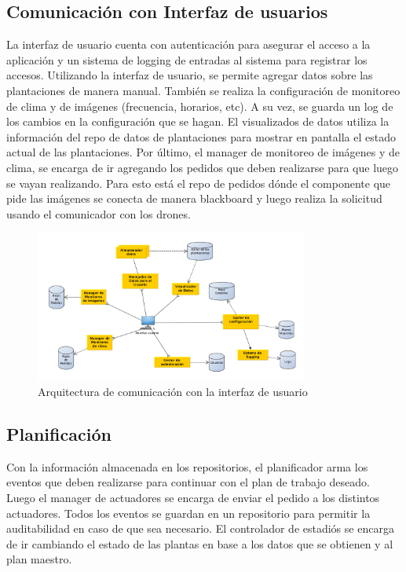 \subsection{Comunicación con Interfaz de usuarios}

La interfaz de usuario cuenta con autenticación para asegurar el acceso a la aplicación y un sistema de logging de entradas al sistema para registrar los accesos.
Utilizando la interfaz de usuario, se permite agregar datos sobre las plantaciones de manera manual. También se realiza la configuración de monitoreo de clima y de imágenes (frecuencia, horarios, etc). A su vez, se guarda un log de los cambios en la configuración que se hagan. El visualizados de datos utiliza la información del repo de datos de plantaciones para mostrar en pantalla el estado actual de las plantaciones.
Por último, el manager de monitoreo de imágenes  y de clima, se encarga de ir agregando los pedidos que deben realizarse para que luego se vayan realizando. Para esto está el repo de pedidos dónde el componente que pide las imágenes se conecta de manera blackboard y luego realiza la solicitud usando el comunicador con los drones.

\begin{figure}[h!]
  \centering
  \includegraphics[width=0.8\textwidth]{./images/arq_interfazusuario.png}
  \caption{Arquitectura de comunicación con la interfaz de usuario}
  \label{fig:clases4}
\end{figure}

\subsection{Planificación}

Con la información almacenada en los repositorios, el planificador arma los eventos que deben realizarse para continuar con el plan de trabajo deseado. Luego el manager de actuadores se encarga de enviar el pedido a los distintos actuadores. Todos los eventos se guardan en un repositorio para permitir la auditabilidad en caso de que sea necesario. El controlador de estadiós se encarga de ir cambiando el estado de las plantas en base a los datos que se obtienen y al plan maestro.

